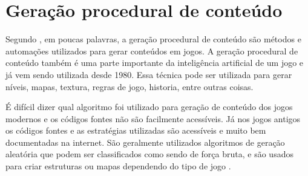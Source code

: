 \section{Geração procedural de conteúdo}

Segundo , em poucas palavras, a geração procedural de conteúdo são métodos e automações utilizados para gerar conteúdos em jogos. A geração procedural de conteúdo também é uma parte importante da inteligência artificial de um jogo e já vem sendo utilizada desde 1980.
Essa técnica pode ser utilizada para gerar níveis, mapas, textura, regras de jogo, historia, entre outras coisas.

É difícil dizer qual algoritmo foi utilizado para geração de conteúdo dos jogos modernos e os códigos fontes não são facilmente acessíveis. Já nos jogos antigos os códigos fontes e as estratégias utilizadas são acessíveis e muito bem documentadas na internet. São geralmente utilizados algoritmos de geração aleatória que podem ser classificados como sendo de força bruta, e são usados para criar estruturas ou mapas dependendo do tipo de jogo \cite{dormans2010adventures}.

